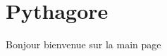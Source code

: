 \chapter{Pythagore}
\hypertarget{index}{}\label{index}
\label{index_md_README}%
%
 Bonjour bienvenue sur la main page 